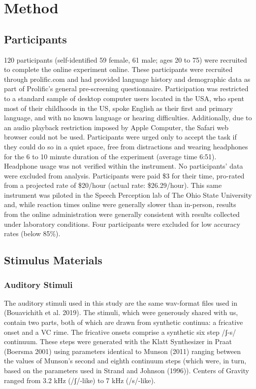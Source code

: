 \documentclass[
  letterpaper,
  DIV=11,
  numbers=noendperiod]{scrartcl}
\begin{document}
\section{Method}\label{sec-method}

\subsection{Participants}\label{sub-participants}

120 participants (self-identified 59 female, 61 male; ages 20 to 75)
were recruited to complete the online experiment online. These
participants were recruited through prolific.com and had provided
language history and demographic data as part of Prolific's general
pre-screening questionnaire. Participation was restricted to a standard
sample of desktop computer users located in the USA, who spent most of
their childhoods in the US, spoke English as their first and primary
language, and with no known language or hearing difficulties.
Additionally, due to an audio playback restriction imposed by Apple
Computer, the Safari web browser could not be used. Participants were
urged only to accept the task if they could do so in a quiet space, free
from distractions and wearing headphones for the 6 to 10 minute duration
of the experiment (average time 6:51). Headphone usage was not verified
within the instrument. No participants' data were excluded from
analysis. Participants were paid \$3 for their time, pro-rated from a
projected rate of \$20/hour (actual rate: \$26.29/hour). This same
instrument was piloted in the Speech Perception lab of The Ohio State
University and, while reaction times online were generally slower than
in-person, results from the online administration were generally
consistent with results collected under laboratory conditions. Four
participants were excluded for low accuracy rates (below 85\%).

\subsection{Stimulus Materials}\label{sub-stimuli}

\subsubsection{Auditory Stimuli}\label{sub-stimuli-auditory}

The auditory stimuli used in this study are the same wav-format files
used in (Bouavichith et al. 2019). The stimuli, which were generously
shared with us, contain two parts, both of which are drawn from
synthetic continua: a fricative onset and a VC rime. The fricative
onsets comprise a synthetic six step /ʃ-s/ continuum. These steps were
generated with the Klatt Synthesizer in Praat (Boersma 2001) using
parameters identical to Munson (2011) ranging between the values of
Munson's second and eighth continuum steps (which were, in turn, based
on the parameters used in Strand and Johnson (1996)). Centers of Gravity
ranged from 3.2 kHz (/ʃ/-like) to 7 kHz (/s/-like).
\end{document}
